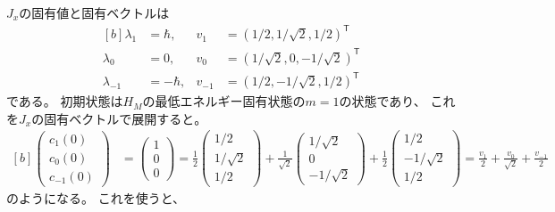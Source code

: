 \documentclass[../ap_2012.tex]{subfiles}
\begin{document}
\(J_x\)の固有値と固有ベクトルは
\begin{equation}\begin{aligned}[b]
    \lambda_1 &= \hbar,& v_1 &= (1/2,1/\sqrt{2},1/2)^\mathsf{T}\\
    \lambda_0 &= 0,& v_0 &= (1/\sqrt{2},0,-1/\sqrt{2})^\mathsf{T}\\
    \lambda_{-1} &= -\hbar,& v_{-1} &= (1/2,-1/\sqrt{2},1/2)^\mathsf{T}
\end{aligned}\end{equation}
である。
初期状態は\(H_M\)の最低エネルギー固有状態の\(m=1\)の状態であり、
これを\(J_x\)の固有ベクトルで展開すると。
\begin{equation}\begin{aligned}[b]
    \begin{pmatrix}
        {c_1(0)}\\
        {c_0(0)}\\
        {c_{-1}(0)}
    \end{pmatrix}
    &=\begin{pmatrix}
        1\\
        0\\
        0
    \end{pmatrix}
    =\frac{1}{2}\begin{pmatrix}
        1/2\\
        1/\sqrt{2}\\
        1/2
    \end{pmatrix}
    +\frac{1}{\sqrt{2}}\begin{pmatrix}
        1/\sqrt{2}\\
        0\\
        -1/\sqrt{2}
    \end{pmatrix}
    +\frac{1}{2}\begin{pmatrix}
        1/2\\
        -1/\sqrt{2}\\
        1/2
    \end{pmatrix}
    =\frac{v_1}{2}+\frac{v_0}{\sqrt{2}}+\frac{v_{-1}}{2}
\end{aligned}\end{equation}
のようになる。
これを使うと、
\end{document}
